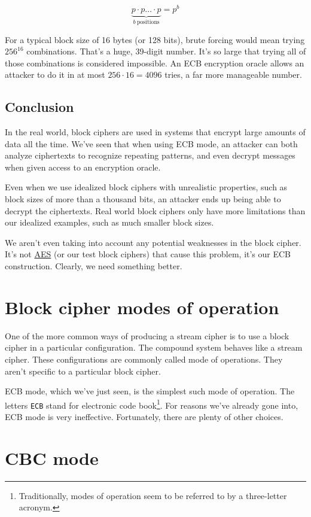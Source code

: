 \documentclass[11pt,ebook,table,dvipsnames]{memoir}
\begin{document}
\[
\underbrace{p \cdot p \ldots \cdot p}_{b \ \mathrm{positions}} = p^b
\]

For a typical block size of 16 bytes (or 128 bits), brute forcing
would mean trying $256^{16}$ combinations. That's a huge, 39-digit
number. It's so large that trying all of those combinations is
considered impossible. An ECB encryption oracle allows an attacker to
do it in at most $256 \cdot 16 = 4096$ tries, a far more manageable
number.
\subsection{Conclusion}
\label{sec-2-3-2-4}

In the real world, block ciphers are used in systems that encrypt
large amounts of data all the time. We've seen that when using
\gls{ECB mode}, an attacker can both analyze ciphertexts to recognize
repeating patterns, and even decrypt messages when given access to an
\gls{encryption oracle}.

Even when we use idealized block ciphers with unrealistic properties,
such as block sizes of more than a thousand bits, an attacker ends up
being able to decrypt the ciphertexts. Real world block ciphers only
have more limitations than our idealized examples, such as much
smaller block sizes.

We aren't even taking into account any potential weaknesses in the
block cipher. It's not \hyperref[AES]{AES} (or our test block ciphers) that cause this
problem, it's our ECB construction. Clearly, we need something better.
\section{Block cipher modes of operation}
\label{sec-2-3-3}

One of the more common ways of producing a \gls{stream cipher} is to
use a block cipher in a particular configuration. The compound system
behaves like a stream cipher. These configurations are commonly called
\glspl{mode of operation}. They aren't specific to a particular block
cipher.

\Gls{ECB mode}, which we've just seen, is the simplest such mode of
operation. The letters \verb~ECB~ stand for electronic code book\footnote{Traditionally, modes of operation seem to be referred to by a
three-letter acronym.}. For reasons we've already gone into, ECB mode
is very ineffective. Fortunately, there are plenty of other choices.
\section{\label{CBC-mode}CBC mode}
\label{sec-2-3-4}
\end{document}
